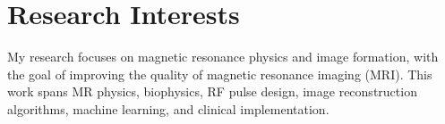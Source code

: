 \section{\sc Research Interests}
My research focuses on magnetic resonance physics and image formation, with the goal of improving the quality of magnetic resonance imaging (MRI). This work spans MR physics, biophysics, RF pulse design, image reconstruction algorithms, machine learning, and clinical implementation.

\endinput